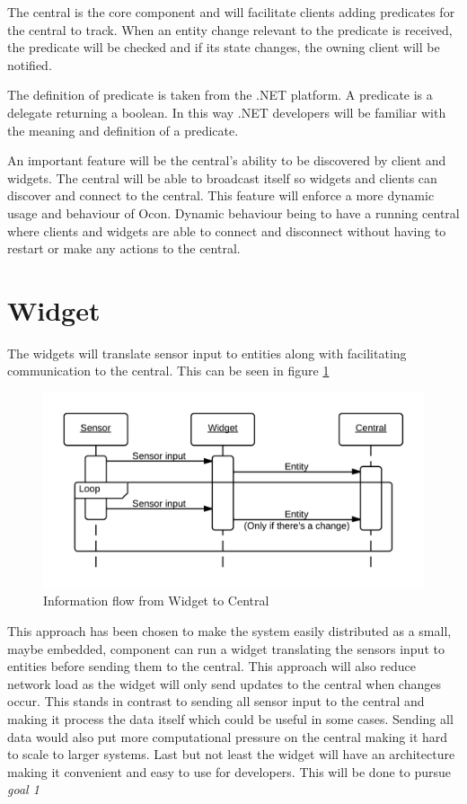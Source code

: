 \documentclass[../report.tex]{subfiles}
\begin{document}
The central is the core component and will facilitate clients adding predicates for the central to track. When an entity change relevant to the predicate is received, the predicate will be checked and if its state changes, the owning client will be notified.

The definition of predicate is taken from the .NET platform. A predicate is a delegate returning a boolean. In this way .NET developers will be familiar with the meaning and definition of a predicate.

An important feature will be the central's ability to be discovered by client and widgets. The central will be able to broadcast itself so widgets and clients can discover and connect to the central. This feature will enforce a more dynamic usage and behaviour of Ocon. Dynamic behaviour being to have a running central where clients and widgets are able to connect and disconnect without having to restart or make any actions to the central.
 
\section{Widget}

The widgets will translate sensor input to entities along with facilitating communication to the central. This can be seen in figure \ref{fig:seqwidget}

\begin{figure}[h]
\centering
\includegraphics[scale=0.2]{sequencediagram-widget.png}
\caption{Information flow from Widget to Central}
\label{fig:seqwidget}
\end{figure}

This approach has been chosen to make the system easily distributed as a small, maybe embedded, component can run a widget translating the sensors input to entities before sending them to the central. This approach will also reduce network load as the widget will only send updates to the central when changes occur. This stands in contrast to sending all sensor input to the central and making it process the data itself which could be useful in some cases. Sending all data would also put more computational pressure on the central making it hard to scale to larger systems. Last but not least the widget will have an architecture making it convenient and easy to use for developers. This will be done to pursue \textit{goal 1}
\end{document}
